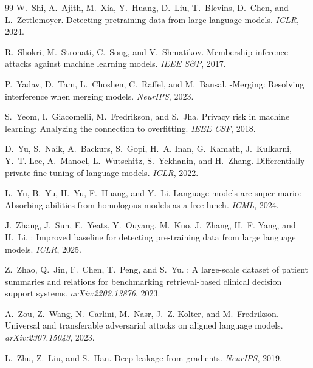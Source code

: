 \documentclass[11pt]{article}
\theoremstyle{plain}
\theoremstyle{definition}
\begin{document}
\begin{thebibliography}{99}
W.~Shi, A.~Ajith, M.~Xia, Y.~Huang, D.~Liu, T.~Blevins, D.~Chen, and L.~Zettlemoyer.
\newblock Detecting pretraining data from large language models. \emph{ICLR}, 2024.

R.~Shokri, M.~Stronati, C.~Song, and V.~Shmatikov.
\newblock Membership inference attacks against machine learning models. \emph{IEEE S\&P}, 2017.

P.~Yadav, D.~Tam, L.~Choshen, C.~Raffel, and M.~Bansal.
-Merging: Resolving interference when merging models. \emph{NeurIPS}, 2023.

S.~Yeom, I.~Giacomelli, M.~Fredrikson, and S.~Jha.
\newblock Privacy risk in machine learning: Analyzing the connection to overfitting. \emph{IEEE CSF}, 2018.

D.~Yu, S.~Naik, A.~Backurs, S.~Gopi, H.~A. Inan, G.~Kamath, J.~Kulkarni, Y.~T. Lee, A.~Manoel, L.~Wutschitz, S.~Yekhanin, and H.~Zhang.
\newblock Differentially private fine-tuning of language models. \emph{ICLR}, 2022.

L.~Yu, B.~Yu, H.~Yu, F.~Huang, and Y.~Li.
\newblock Language models are super mario: Absorbing abilities from homologous models as a free lunch. \emph{ICML}, 2024.

J.~Zhang, J.~Sun, E.~Yeats, Y.~Ouyang, M.~Kuo, J.~Zhang, H.~F. Yang, and H.~Li.
: Improved baseline for detecting pre-training data from large language models. \emph{ICLR}, 2025.

Z.~Zhao, Q.~Jin, F.~Chen, T.~Peng, and S.~Yu.
: A large-scale dataset of patient summaries and relations for benchmarking retrieval-based clinical decision support systems. \emph{arXiv:2202.13876}, 2023.

A.~Zou, Z.~Wang, N.~Carlini, M.~Nasr, J.~Z. Kolter, and M.~Fredrikson.
\newblock Universal and transferable adversarial attacks on aligned language models. \emph{arXiv:2307.15043}, 2023.

L.~Zhu, Z.~Liu, and S.~Han.
\newblock Deep leakage from gradients. \emph{NeurIPS}, 2019.

\end{thebibliography}
\end{document}
